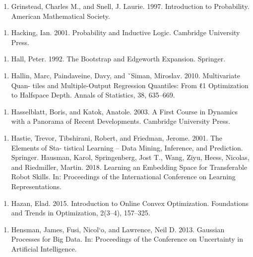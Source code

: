 \begin{enumerate}
\item Grinstead, Charles M., and Snell, J. Laurie. 1997. Introduction to Probability. American Mathematical Society.
\end{enumerate}

\begin{enumerate}
\item Hacking, Ian. 2001. Probability and Inductive Logic. Cambridge University Press.
\end{enumerate}

\begin{enumerate}
\item Hall, Peter. 1992. The Bootstrap and Edgeworth Expansion. Springer.
\end{enumerate}

\begin{enumerate}
\item Hallin, Marc, Paindaveine, Davy, and ˇSiman, Miroslav. 2010. Multivariate Quan- tiles and Multiple-Output Regression Quantiles: From ℓ1 Optimization to Halfspace Depth. Annals of Statistics, 38, 635–669.
\end{enumerate}

\begin{enumerate}
\item Hasselblatt, Boris, and Katok, Anatole. 2003. A First Course in Dynamics with a Panorama of Recent Developments. Cambridge University Press.
\end{enumerate}

\begin{enumerate}
\item Hastie, Trevor, Tibshirani, Robert, and Friedman, Jerome. 2001. The Elements of Sta- tistical Learning – Data Mining, Inference, and Prediction. Springer. Hausman, Karol, Springenberg, Jost T., Wang, Ziyu, Heess, Nicolas, and Riedmiller, Martin. 2018. Learning an Embedding Space for Transferable Robot Skills. In: Proceedings of the International Conference on Learning Representations.
\end{enumerate}

\begin{enumerate}
\item Hazan, Elad. 2015. Introduction to Online Convex Optimization. Foundations and Trends in Optimization, 2(3–4), 157–325.
\end{enumerate}

\begin{enumerate}
\item Hensman, James, Fusi, Nicol`o, and Lawrence, Neil D. 2013. Gaussian Processes for Big Data. In: Proceedings of the Conference on Uncertainty in Artiﬁcial Intelligence.
\end{enumerate}

